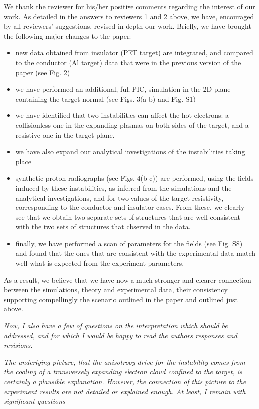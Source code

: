 \documentclass{article}
\begin{document}
We thank the reviewer for his/her positive comments regarding the interest of our work. As detailed in the answers to reviewers 1 and 2 above, we have, encouraged by all reviewers’ suggestions, revised in depth our work.
Briefly, we have brought the following major changes to the paper:
\begin{itemize}
    \item new data obtained from insulator (PET target) are integrated, and compared to the conductor (Al target) data that were in the previous version of the paper (see Fig. 2)
    \item we have performed an additional, full PIC, simulation in the 2D plane containing the target normal (see Figs. 3(a-b) and Fig. S1)
    \item we have identified that two instabilities can affect the hot electrons: a collisionless one in the expanding plasmas on both sides of the target, and a resistive one in the target plane. 
    \item we have also expand our analytical investigations of the instabilities taking place
    \item synthetic proton radiographs (see Figs. 4(b-c)) are performed, using the fields induced by these instabilities, as inferred from the simulations and the analytical investigations, and for two values of the target resistivity, corresponding to the conductor and insulator cases. From these, we clearly see that we obtain two separate sets of structures that are well-consistent with the two sets of structures that observed in the data. 
    \item finally, we have performed a scan of parameters for the fields (see Fig. S8) and found that the ones that are consistent with the experimental data match well what is expected from the experiment parameters. 
\end{itemize}

As a result, we believe that we have now a much stronger and clearer connection between the simulations, theory and experimental data, their consistency supporting compellingly the scenario outlined in the paper and outlined just above.

\textit{
Now, I also have a few of questions on the interpretation which should be addressed, and for which I would be happy to read the authors responses and revisions.}

\textit{
The underlying picture, that the anisotropy drive for the instability comes from the cooling of a transversely expanding electron cloud confined to the target, is certainly a plausible explanation. However, the connection of this picture to the experiment results are not detailed or explained enough. At least, I remain with significant questions -}
\end{document}
